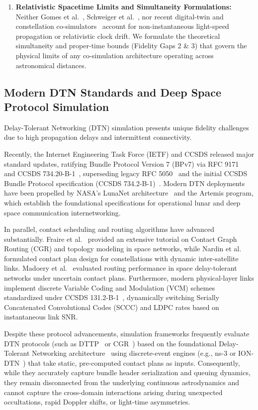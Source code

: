 \documentclass[a4paper,fleqn]{cas-sc}
\begin{document}
{\begin{enumerate}
    \item \textbf{Relativistic Spacetime Limits and Simultaneity Formulations:} Neither Gomes et al.~\cite{simpat_adaptive}, Schweiger et al.~\cite{simpat_multirate}, nor recent digital-twin and constellation co-simulators~\cite{mao_satellite_dt_2024, kassing_hypatia_2020} account for non-instantaneous light-speed propagation or relativistic clock drift. We formulate the theoretical simultaneity and proper-time bounds (Fidelity Gaps 2 \& 3) that govern the physical limits of any co-simulation architecture operating across astronomical distances.
\end{enumerate}}

\subsection{Modern DTN Standards and Deep Space Protocol Simulation}
Delay-Tolerant Networking (DTN) simulation presents unique fidelity challenges due to high propagation delays and intermittent connectivity. {\color{revcolor}Recently, the Internet Engineering Task Force (IETF) and CCSDS released major standard updates, ratifying Bundle Protocol Version 7 (BPv7) via RFC 9171~\cite{rfc9171} and CCSDS 734.20-B-1~\cite{ccsds_bpv7_2024}, superseding legacy RFC 5050~\cite{dtn_emulation} and the initial CCSDS Bundle Protocol specification (CCSDS 734.2-B-1)~\cite{ccsds_bp}. Modern DTN deployments have been propelled by NASA's LunaNet architecture~\cite{nasa_lunanet_2023, israel_lunanet_2020} and the Artemis program, which establish the foundational specifications for operational lunar and deep space communication internetworking.

In parallel, contact scheduling and routing algorithms have advanced substantially. Fraire et al.~\cite{fraire_cgr_tutorial_2021} provided an extensive tutorial on Contact Graph Routing (CGR) and topology modeling in space networks, while Nardin et al.~\cite{nardin_contact_plan_2022} formulated contact plan design for constellations with dynamic inter-satellite links. Madoery et al.~\cite{madoery_uncertain_cgr_2018} evaluated routing performance in space delay-tolerant networks under uncertain contact plans. Furthermore, modern physical-layer links implement discrete Variable Coding and Modulation (VCM) schemes standardized under CCSDS 131.2-B-1~\cite{ccsds_vcm_131_2}, dynamically switching Serially Concatenated Convolutional Codes (SCCC) and LDPC rates based on instantaneous link SNR.}

Despite these protocol advancements, simulation frameworks frequently evaluate DTN protocols (such as DTTP~\cite{acta_dttp} or CGR~\cite{acta_cgr}) based on the foundational Delay-Tolerant Networking architecture~\cite{cerf_dtn} using discrete-event engines (e.g., ns-3 or ION-DTN~\cite{ion_dtn}) that take static, pre-computed contact plans as inputs. Consequently, while they accurately capture bundle header serialization and queuing dynamics, they remain disconnected from the underlying continuous astrodynamics and cannot capture the cross-domain interactions arising during unexpected occultations, rapid Doppler shifts, or light-time asymmetries.
\end{document}
